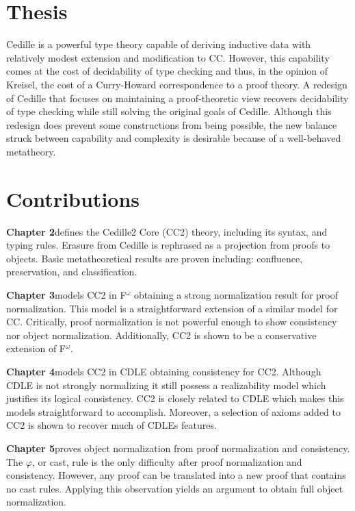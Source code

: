 \section{Thesis}

Cedille is a powerful type theory capable of deriving inductive data with relatively modest extension and modification to CC.
However, this capability comes at the cost of decidability of type checking and thus, in the opinion of Kreisel, the cost of a Curry-Howard correspondence to a proof theory.
A redesign of Cedille that focuses on maintaining a proof-theoretic view recovers decidability of type checking while still solving the original goals of Cedille.
Although this redesign does prevent some constructions from being possible, the new balance struck between capability and complexity is desirable because of a well-behaved metatheory.

\section{Contributions}

\textbf{Chapter 2}\quad defines the Cedille2 Core (CC2) theory, including its syntax, and typing rules.
Erasure from Cedille is rephrased as a projection from proofs to objects.
Basic metatheoretical results are proven including: confluence, preservation, and classification.

\textbf{Chapter 3}\quad models CC2 in F$^\omega$ obtaining a strong normalization result for proof normalization.
This model is a straightforward extension of a similar model for CC.
Critically, proof normalization is not powerful enough to show consistency nor object normalization.
Additionally, CC2 is shown to be a conservative extension of F$^\omega$.

\textbf{Chapter 4}\quad models CC2 in CDLE obtaining consistency for CC2.
Although CDLE is not strongly normalizing it still possess a realizability model which justifies its logical consistency.
CC2 is closely related to CDLE which makes this models straightforward to accomplish.
Moreover, a selection of axioms added to CC2 is shown to recover much of CDLEs features.

\textbf{Chapter 5}\quad proves object normalization from proof normalization and consistency.
The $\varphi$, or cast, rule is the only difficulty after proof normalization and consistency.
However, any proof can be translated into a new proof that contains no cast rules.
Applying this observation yields an argument to obtain full object normalization.

